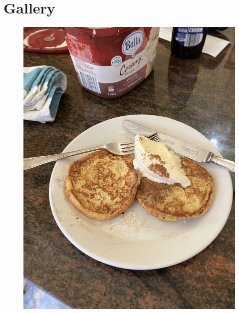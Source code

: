 \documentclass[]{article}
\begin{document}
\part{\Huge Gallery}
\newpage
\newpage\begin{figure}[H]
\begin{center}\hyperref[rec:French Toast]{\includegraphics[keepaspectratio,width=\textheight,height=\textwidth,angle=-90]{Gallery/French Toast}}\caption*{}\label{fig:French Toast}\end{center}
\end{figure}
\end{document}

